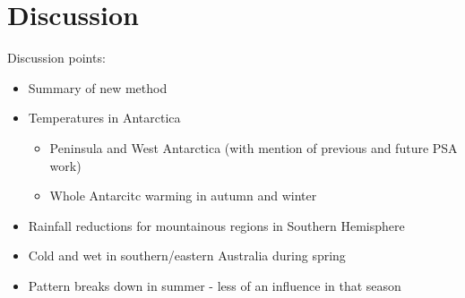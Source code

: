 \section{Discussion}

Discussion points:
\begin{itemize}
\item Summary of new method
\item Temperatures in Antarctica
\begin{itemize}
\item Peninsula and West Antarctica (with mention of previous and future PSA work)
\item Whole Antarcitc warming in autumn and winter
\end{itemize}
\item Rainfall reductions for mountainous regions in Southern Hemisphere
\item Cold and wet in southern/eastern Australia during spring
\item Pattern breaks down in summer - less of an influence in that season
\end{itemize}